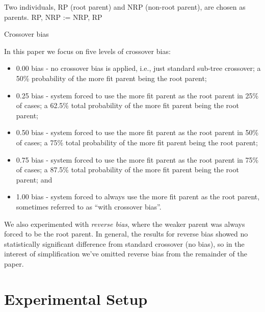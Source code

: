 \documentclass{sig-alternate}
\begin{document}
\begin{algorithm}[tb]
\begin{algorithmic}
\Require Two individuals, RP (root parent) and NRP (non-root parent), are chosen as parents.
 
        \State RP, NRP := NRP, RP  
    \EndIf
\EndIf
\end{algorithmic}
\caption{Crossover bias}
\label{alg:biasAlgorithm}
\end{algorithm}

In this paper we focus on five levels of crossover bias:
\begin{itemize}
\item 0.00 bias - no crossover bias is applied, i.e., just standard sub-tree crossover; 
	a 50\% probability of the more fit parent being the root parent;
\item 0.25 bias - system forced to use the more fit parent as the root parent in 25\% of cases; 
	a 62.5\% total probability of the more fit parent being the root parent;
\item 0.50 bias - system forced to use the more fit parent as the root parent in 50\% of cases; 
	a 75\% total probability of the more fit parent being the root parent;
\item 0.75 bias - system forced to use the more fit parent as the root parent in 75\% of cases; 
	a 87.5\% total probability of the more fit parent being the root parent; and
\item 1.00 bias - system forced to always use the more fit parent as the root parent, sometimes 
	referred to as ``with crossover bias''.
\end{itemize}

We also experimented with \emph{reverse bias}, where the weaker parent was always forced to be the root parent. In
general, the results for reverse bias showed no statistically significant difference from standard crossover (no bias),
so in the interest of simplification we've omitted reverse bias from the remainder of the paper.

\section{Experimental Setup} \label{sec:Experiments}
\end{document}
